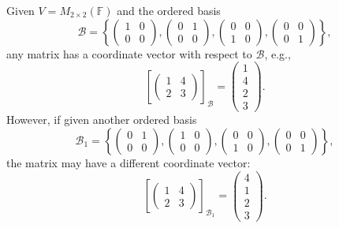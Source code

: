 \begin{example}\label{ex:coordinate_matrix_example}
Given \(V = M_{2 \times 2}(\mathbb{F})\) and the ordered basis
\[
\mathcal{B} = \left\{ \begin{pmatrix} 1 & 0 \\ 0 & 0 \end{pmatrix}, \begin{pmatrix} 0 & 1 \\ 0 & 0 \end{pmatrix}, \begin{pmatrix} 0 & 0 \\ 1 & 0 \end{pmatrix}, \begin{pmatrix} 0 & 0 \\ 0 & 1 \end{pmatrix} \right\},
\]
any matrix has a coordinate vector with respect to \(\mathcal{B}\), e.g.,
\[
\left[ \begin{pmatrix} 1 & 4 \\ 2 & 3 \end{pmatrix} \right]_{\mathcal{B}} = \begin{pmatrix} 1 \\ 4 \\ 2 \\ 3 \end{pmatrix}.
\]
However, if given another ordered basis
\[
\mathcal{B}_1 = \left\{ \begin{pmatrix} 0 & 1 \\ 0 & 0 \end{pmatrix}, \begin{pmatrix} 1 & 0 \\ 0 & 0 \end{pmatrix}, \begin{pmatrix} 0 & 0 \\ 1 & 0 \end{pmatrix}, \begin{pmatrix} 0 & 0 \\ 0 & 1 \end{pmatrix} \right\},
\]
the matrix may have a different coordinate vector:
\[
\left[ \begin{pmatrix} 1 & 4 \\ 2 & 3 \end{pmatrix} \right]_{\mathcal{B}_1} = \begin{pmatrix} 4 \\ 1 \\ 2 \\ 3 \end{pmatrix}.
\]
\end{example}

